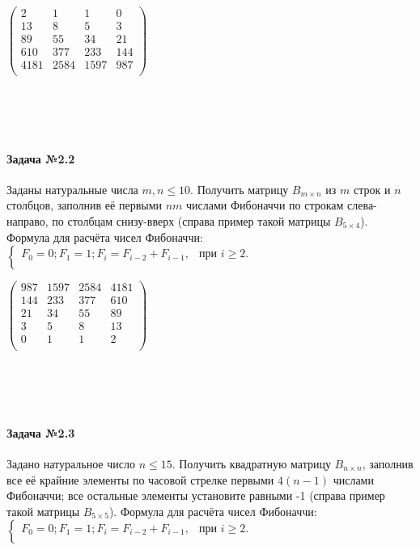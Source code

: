 \documentclass[12pt,a4paper]{report}
\begin{document}
\hfill
\begin{minipage}{0.24\textwidth}
$\begin{pmatrix}
2 & 1 & 1 & 0 \\
13 & 8 & 5 & 3 \\
89 & 55 & 34 & 21 \\
610 & 377 & 233 & 144 \\
4181 & 2584 & 1597 & 987 \\
\end{pmatrix}$
\end{minipage}
\\ \\ \\
\noindent %
\begin{minipage}{0.75\textwidth}
\paragraph*{Задача №2.2}
Заданы натуральные числа $m, n \le 10$. Получить матрицу $B_{m \times n}$ из $m$ строк и $n$ столбцов, заполнив её первыми $nm$ числами Фибоначчи по строкам слева-направо, по столбцам снизу-вверх (справа пример такой матрицы $B_{5 \times 4}$). Формула для расчёта чисел Фибоначчи: \\
$\begin{cases}
F_0 = 0; F_1 = 1; F_i = F_{i-2} + F_{i-1}, & \text{при } i \ge 2. \\
\end{cases}$
\end{minipage}
\hfill
\begin{minipage}{0.24\textwidth}
$\begin{pmatrix}
987 & 1597 & 2584 & 4181 \\
144 & 233 & 377 & 610 \\
21 & 34 & 55 & 89 \\
3 & 5 & 8 & 13 \\
0 & 1 & 1 & 2 \\
\end{pmatrix}$
\end{minipage}
\\ \\ \\
\noindent %
\begin{minipage}{0.75\textwidth}
\paragraph*{Задача №2.3}
Задано натуральное число $n \le 15$. Получить квадратную матрицу $B_{n \times n}$, заполнив все её крайние элементы по часовой стрелке первыми $4(n-1)$ числами Фибоначчи; все остальные элементы установите равными -1 (справа пример такой матрицы $B_{5 \times 5}$). Формула для расчёта чисел Фибоначчи: \\
$\begin{cases}
F_0 = 0; F_1 = 1; F_i = F_{i-2} + F_{i-1}, & \text{при } i \ge 2. \\
\end{cases}$
\end{minipage}
\end{document}
